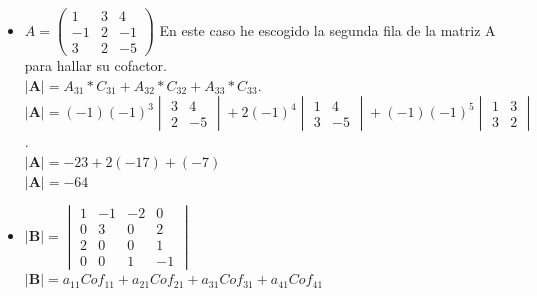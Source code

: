 \documentclass[stu, 12pt, a4paper, donotrepeattitle, floatsintext, natbib]{apa7}
\begin{document}
    \begin{itemize}
        \item $
        A= \begin{pmatrix}
               1 & 3 & 4 \\ -1 & 2 & -1 \\ 3 & 2 & -5
        \end{pmatrix}
        $
        \vspace{0.5cm}
        En este caso he escogido la segunda fila de la matriz A para hallar su cofactor.\\
        $\textbf{|A|} = A_{31}*C_{31} + A_{32}*C_{32} + A_{33}*C_{33}$.\\[0.5cm]
        $\textbf{|A|} =
        (-1)(-1)^3 \begin{vmatrix}
                       3 & 4 \\ 2 & -5
        \end{vmatrix}
        +
        2(-1)^4 \begin{vmatrix}
                    1 & 4 \\ 3 & -5
        \end{vmatrix}
        +
        (-1)(-1)^5\begin{vmatrix}
                      1 & 3 \\ 3 & 2
        \end{vmatrix}
        $.\\[0.5cm]
        $\textbf{|A|} = -23 + 2(-17) + (-7)$\\
        $\textbf{|A|}=-64$\\[1cm]

        \newpage

        \item $
        \textbf{|B|}= \begin{vmatrix}
                          1 & -1 & -2 & 0  \\
                          0 & 3  & 0  & 2  \\
                          2 & 0  & 0  & 1  \\
                          0 & 0  & 1  & -1
        \end{vmatrix}
        $\\[0.5cm]
        $\textbf{|B|}=a_{11}{Cof}_{11} + a_{21}{Cof}_{21} + a_{31}{Cof}_{31} + a_{41}{Cof}_{41}$\\[0.5cm]


\end{itemize}
\end{document}
